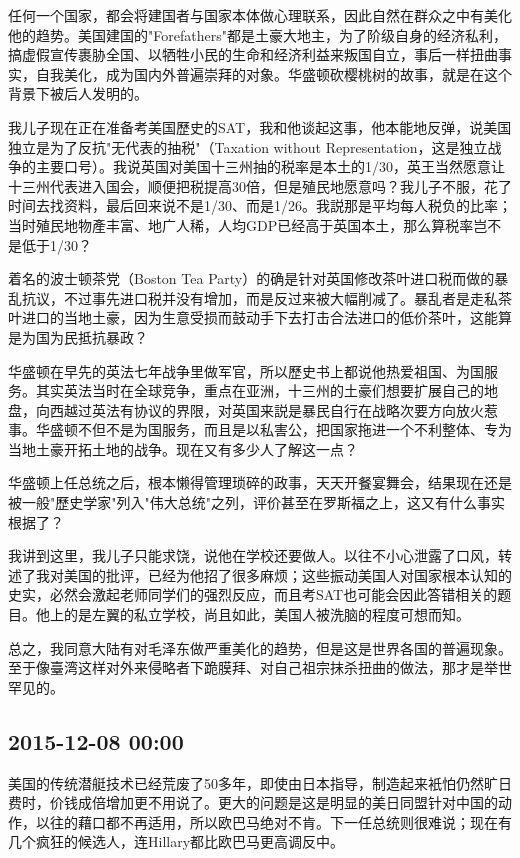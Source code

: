\documentclass[twocolumn]{ctexart}
\begin{document}
任何一个国家，都会将建国者与国家本体做心理联系，因此自然在群众之中有美化他的趋势。美国建国的"Forefathers"都是土豪大地主，为了阶级自身的经济私利，搞虚假宣传裹胁全国、以牺牲小民的生命和经济利益来叛国自立，事后一样扭曲事实，自我美化，成为国内外普遍崇拜的对象。华盛顿砍樱桃树的故事，就是在这个背景下被后人发明的。

我儿子现在正在准备考美国歷史的SAT，我和他谈起这事，他本能地反弹，说美国独立是为了反抗"无代表的抽税"（Taxation without Representation，这是独立战争的主要口号）。我说英国对美国十三州抽的税率是本土的1/30，英王当然愿意让十三州代表进入国会，顺便把税提高30倍，但是殖民地愿意吗？我儿子不服，花了时间去找资料，最后回来说不是1/30、而是1/26。我説那是平均每人税负的比率；当时殖民地物產丰富、地广人稀，人均GDP已经高于英国本土，那么算税率岂不是低于1/30？

着名的波士顿茶党（Boston Tea Party）的确是针对英国修改茶叶进口税而做的暴乱抗议，不过事先进口税并没有增加，而是反过来被大幅削减了。暴乱者是走私茶叶进口的当地土豪，因为生意受损而鼓动手下去打击合法进口的低价茶叶，这能算是为国为民抵抗暴政？

华盛顿在早先的英法七年战争里做军官，所以歷史书上都说他热爱祖国、为国服务。其实英法当时在全球竞争，重点在亚洲，十三州的土豪们想要扩展自己的地盘，向西越过英法有协议的界限，对英国来説是暴民自行在战略次要方向放火惹事。华盛顿不但不是为国服务，而且是以私害公，把国家拖进一个不利整体、专为当地土豪开拓土地的战争。现在又有多少人了解这一点？

华盛顿上任总统之后，根本懒得管理琐碎的政事，天天开餐宴舞会，结果现在还是被一般"歷史学家"列入"伟大总统"之列，评价甚至在罗斯福之上，这又有什么事实根据了？

我讲到这里，我儿子只能求饶，说他在学校还要做人。以往不小心泄露了口风，转述了我对美国的批评，已经为他招了很多麻烦；这些振动美国人对国家根本认知的史实，必然会激起老师同学们的强烈反应，而且考SAT也可能会因此答错相关的题目。他上的是左翼的私立学校，尚且如此，美国人被洗脑的程度可想而知。

总之，我同意大陆有对毛泽东做严重美化的趋势，但是这是世界各国的普遍现象。至于像臺湾这样对外来侵略者下跪膜拜、对自己祖宗抹杀扭曲的做法，那才是举世罕见的。\subsection*{2015-12-08 00:00}
美国的传统潜艇技术已经荒废了50多年，即使由日本指导，制造起来衹怕仍然旷日费时，价钱成倍增加更不用说了。更大的问题是这是明显的美日同盟针对中国的动作，以往的藉口都不再适用，所以欧巴马绝对不肯。下一任总统则很难说；现在有几个疯狂的候选人，连Hillary都比欧巴马更高调反中。
\end{document}
